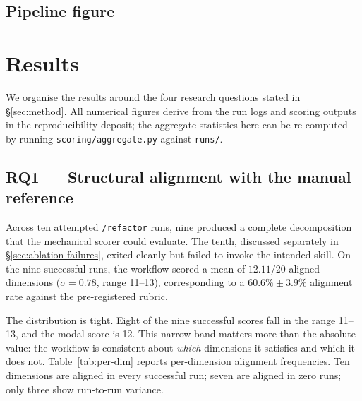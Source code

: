 \documentclass[journal]{IEEEtran}
\begin{document}
\subsection{Pipeline figure}


\section{Results}
\label{sec:results}

We organise the results around the four research questions stated in
\S\ref{sec:method}. All numerical figures derive from the run logs
and scoring outputs in the reproducibility deposit; the aggregate
statistics here can be re-computed by running
\texttt{scoring/aggregate.py} against \texttt{runs/}.

\subsection{RQ1 --- Structural alignment with the manual reference}

Across ten attempted \texttt{/refactor} runs, nine produced a
complete decomposition that the mechanical scorer could evaluate. The
tenth, discussed separately in \S\ref{sec:ablation-failures}, exited
cleanly but failed to invoke the intended skill. On the nine
successful runs, the workflow scored a mean of $12.11 / 20$ aligned
dimensions ($\sigma = 0.78$, range 11--13), corresponding to a
$60.6\% \pm 3.9\%$ alignment rate against the pre-registered rubric.

The distribution is tight. Eight of the nine successful scores fall
in the range 11--13, and the modal score is 12. This narrow band
matters more than the absolute value: the workflow is consistent
about \emph{which} dimensions it satisfies and which it does not.
Table~\ref{tab:per-dim} reports per-dimension alignment frequencies.
Ten dimensions are aligned in every successful run; seven are aligned
in zero runs; only three show run-to-run variance.
\end{document}
